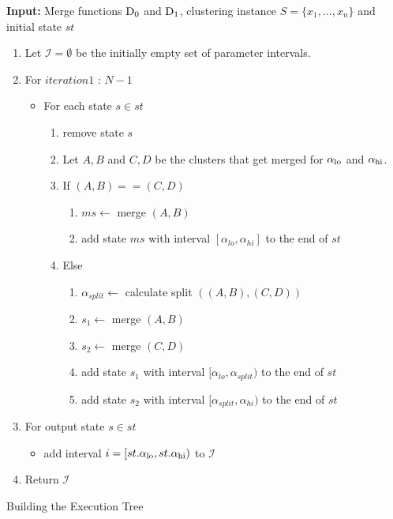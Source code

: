 \begin{algorithm}
    \textbf{Input:} Merge functions $\operatorname{D_{0}}$ and $\operatorname{D_{1}}$, clustering instance $S = \{x_1, \dots, x_n\}$ and initial state $st$
    \begin{enumerate}[nosep, leftmargin=*]
    \item Let $\mathcal{I} = \emptyset$ be the initially empty set of parameter intervals.
    \item For $iteration 1$ : $N-1$
        \begin{itemize}[nosep, leftmargin=*]
        \item For each state $s \in st$
            \begin{enumerate}[nosep, leftmargin=*]
                \item remove state $s$
                \item Let $A, B$ and $C, D$ be the clusters that get merged for $\alpha_\text{lo}$ and $\alpha_\text{hi}$.
                \item If $(A,B) == (C,D)$
                \begin{enumerate}[nosep, leftmargin=*]
                    \item $ms \gets$ merge $(A, B)$\;
                    \item add state $ms$ with interval $[\alpha_{lo},\alpha_{hi}]$ to the end of $st$
                \end{enumerate}
                \item Else
                \begin{enumerate}[nosep, leftmargin=*]
                    \item $\alpha_{split} \gets$ calculate split $((A, B), (C, D))$
                    \item $s_1 \gets$ merge $(A,B)$
                    \item $s_2 \gets$ merge $(C, D)$
                    \item add state $s_1$ with interval $[\alpha_{lo},\alpha_{split})$ to the end of $st$
                    \item add state $s_2$ with interval $[\alpha_{split},\alpha_{hi})$ to the end of $st$
                \end{enumerate}
            \end{enumerate}
        \end{itemize}
        \item For output state $s \in st$
            \begin{itemize}
                \item add interval $i = [st.\alpha_\text{lo}, st.\alpha_\text{hi})$ to $\mathcal{I}$
            \end{itemize}
        \item Return $\mathcal{I}$
    \end{enumerate}  
    \caption{Building the Execution Tree}
    \label{alg:alphalinkage1}
\end{algorithm}

